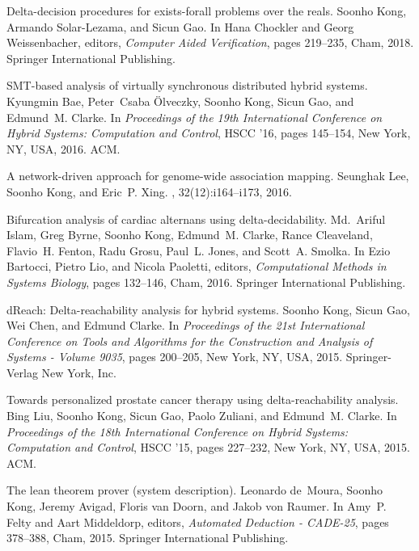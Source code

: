 \documentclass[10pt, letterpaper]{article}
\begin{document}
\begin{thebibliography}{10}
\itemsep0pt

  Delta-decision procedures for exists-forall problems over the reals.
  \newblock Soonho Kong, Armando Solar-Lezama, and Sicun Gao.
  \newblock In Hana Chockler and Georg Weissenbacher, editors, {\em Computer
    Aided Verification}, pages 219--235, Cham, 2018. Springer International
  Publishing.

  {SMT}-based analysis of virtually synchronous distributed hybrid
  systems.
  \newblock Kyungmin Bae, Peter~Csaba \"{O}lveczky, Soonho Kong, Sicun Gao, and Edmund~M.
  Clarke.
  \newblock In {\em Proceedings of the 19th International Conference on Hybrid
    Systems: Computation and Control}, HSCC '16, pages 145--154, New York, NY,
  USA, 2016. ACM.

  A network-driven approach for genome-wide association mapping.
  \newblock Seunghak Lee, Soonho Kong, and Eric~P. Xing.
  , 32(12):i164--i173, 2016.

  Bifurcation analysis of cardiac alternans using delta-decidability.
  \newblock Md.~Ariful Islam, Greg Byrne, Soonho Kong, Edmund~M. Clarke, Rance Cleaveland,
  Flavio~H. Fenton, Radu Grosu, Paul~L. Jones, and Scott~A. Smolka.
  \newblock In Ezio Bartocci, Pietro Lio, and Nicola Paoletti, editors, {\em
  Computational Methods in Systems Biology}, pages 132--146, Cham, 2016.
  Springer International Publishing.

  {dReach}: Delta-reachability analysis for hybrid systems.
  \newblock Soonho Kong, Sicun Gao, Wei Chen, and Edmund Clarke.
  \newblock In {\em Proceedings of the 21st International Conference on Tools and
  Algorithms for the Construction and Analysis of Systems - Volume 9035}, pages
  200--205, New York, NY, USA, 2015. Springer-Verlag New York, Inc.

  Towards personalized prostate cancer therapy using delta-reachability
analysis.
\newblock Bing Liu, Soonho Kong, Sicun Gao, Paolo Zuliani, and Edmund~M. Clarke.
\newblock In {\em Proceedings of the 18th International Conference on Hybrid
  Systems: Computation and Control}, HSCC '15, pages 227--232, New York, NY,
  USA, 2015. ACM.

  The lean theorem prover (system description).
  \newblock Leonardo de~Moura, Soonho Kong, Jeremy Avigad, Floris van Doorn, and Jakob von
  Raumer.
  \newblock In Amy~P. Felty and Aart Middeldorp, editors, {\em Automated
  Deduction - CADE-25}, pages 378--388, Cham, 2015. Springer International
  Publishing.


\end{thebibliography}
\end{document}
